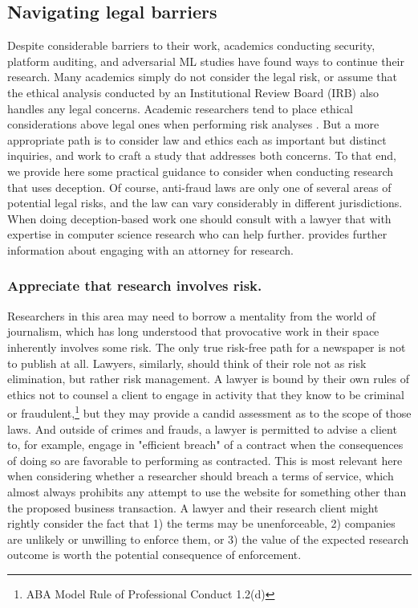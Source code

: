 \subsection{Navigating legal barriers}
Despite considerable barriers to their work, academics conducting security, platform auditing, and adversarial ML studies have found ways to continue their research. Many academics simply do not consider the legal risk, or assume that the ethical analysis conducted by an Institutional Review Board (IRB) also handles any legal concerns. Academic researchers tend to place ethical considerations above legal ones when performing risk analyses \cite{gilbert2024risks}. But a more appropriate path is to consider law and ethics each as important but distinct inquiries, and work to craft a study that addresses both concerns. To that end, we provide here some practical guidance to consider when conducting research that uses deception. Of course, anti-fraud laws are only one of several areas of potential legal risks, and the law can vary considerably in different jurisdictions. When doing deception-based work one should consult with a lawyer that with expertise in computer science research who can help further. \cite{parkResearchersGuideLegal} provides further information about engaging with an attorney for research.

\subsubsection{Appreciate that research involves risk.}
Researchers in this area may need to borrow a mentality from the world of journalism, which has long understood that provocative work in their space inherently involves some risk. The only true risk-free path for a newspaper is not to publish at all. Lawyers, similarly, should think of their role not as risk elimination, but rather risk management. A lawyer is bound by their own rules of ethics not to counsel a client to engage in activity that they know to be criminal or fraudulent,\footnote{ABA Model Rule of Professional Conduct 1.2(d)} but they may provide a candid assessment as to the scope of those laws. And outside of crimes and frauds, a lawyer is permitted to advise a client to, for example, engage in "efficient breach" of a contract when the consequences of doing so are favorable to performing as contracted. This is most relevant here when considering whether a researcher should breach a terms of service, which almost always prohibits any attempt to use the website for something other than the proposed business transaction. A lawyer and their research client might rightly consider the fact that 1) the terms may be unenforceable, 2) companies are unlikely or unwilling to enforce them, or 3) the value of the expected research outcome is worth the potential consequence of enforcement. 

